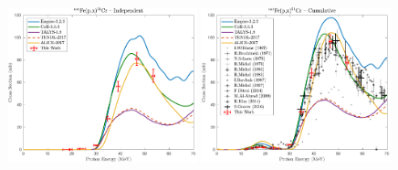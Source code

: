 \begin{figure}
 
 \includegraphics[width=0.49\textwidth]{./figures/51Cr_ind.pdf}
 \includegraphics[width=0.49\textwidth]{./figures/51Cr_cum.pdf}

\vspace{-20pt} 
\end{figure}





